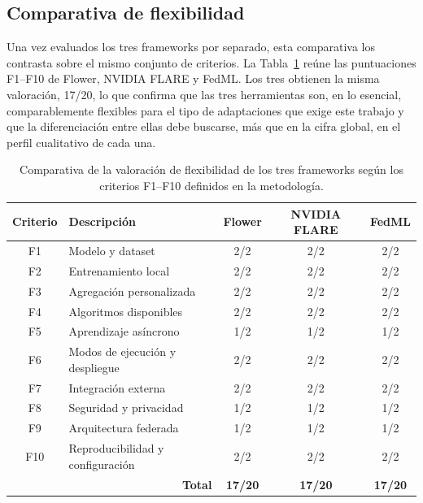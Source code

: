 \subsection{Comparativa de flexibilidad}\label{sec:flex-comparativa}

Una vez evaluados los tres frameworks por separado, esta comparativa los contrasta sobre
el mismo conjunto de criterios. La Tabla~\ref{tab:flex-comparativa} reúne las
puntuaciones F1--F10 de Flower, NVIDIA FLARE y FedML. Los tres obtienen la misma
valoración, 17/20, lo que confirma que las tres herramientas son, en lo esencial,
comparablemente flexibles para el tipo de adaptaciones que exige este trabajo y que la
diferenciación entre ellas debe buscarse, más que en la cifra global, en el perfil
cualitativo de cada una.

\begin{table}[htbp]
  \centering
  \caption{Comparativa de la valoración de flexibilidad de los tres frameworks según
  los criterios F1--F10 definidos en la metodología.}
  \label{tab:flex-comparativa}
  \begin{tabular}{clccc}
    \toprule
    \textbf{Criterio} & \textbf{Descripción} & \textbf{Flower} & \textbf{NVIDIA FLARE} & \textbf{FedML} \\
    \midrule
    F1  & Modelo y dataset                  & 2/2 & 2/2 & 2/2 \\
    F2  & Entrenamiento local               & 2/2 & 2/2 & 2/2 \\
    F3  & Agregación personalizada          & 2/2 & 2/2 & 2/2 \\
    F4  & Algoritmos disponibles            & 2/2 & 2/2 & 2/2 \\
    F5  & Aprendizaje asíncrono             & 1/2 & 1/2 & 1/2 \\
    F6  & Modos de ejecución y despliegue   & 2/2 & 2/2 & 2/2 \\
    F7  & Integración externa               & 2/2 & 2/2 & 2/2 \\
    F8  & Seguridad y privacidad            & 1/2 & 1/2 & 1/2 \\
    F9  & Arquitectura federada             & 1/2 & 1/2 & 1/2 \\
    F10 & Reproducibilidad y configuración  & 2/2 & 2/2 & 2/2 \\
    \midrule
    \multicolumn{2}{r}{\textbf{Total}} & \textbf{17/20} & \textbf{17/20} & \textbf{17/20} \\
    \bottomrule
  \end{tabular}
\end{table}

